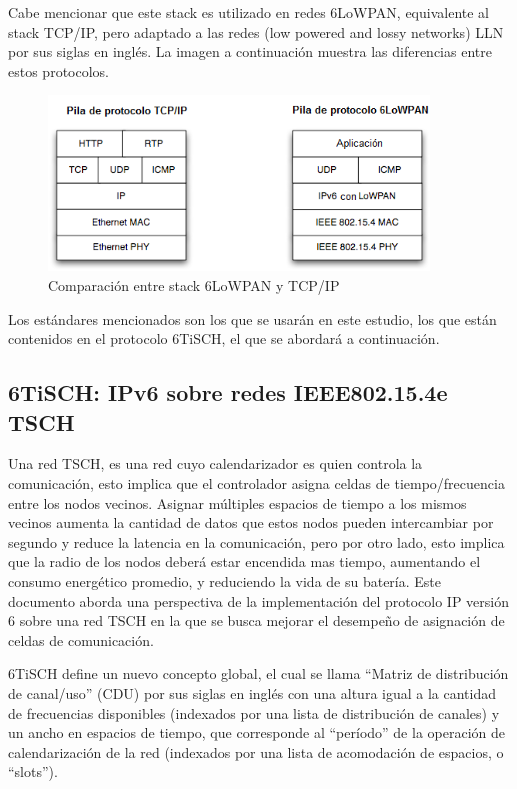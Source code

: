 Cabe mencionar que este stack es utilizado en redes 6LoWPAN, equivalente al stack TCP/IP, pero adaptado a las redes (low powered and lossy networks) LLN por sus siglas en inglés. La imagen a continuación muestra las diferencias entre estos protocolos.

\begin{figure}[h]
\centering
\graphicspath{ {imagenes/} }
\includegraphics[width=0.9\textwidth]{stack.png}
\caption{Comparación entre stack 6LoWPAN y TCP/IP}
\label{stack}
\end{figure}

Los estándares mencionados son los que se usarán en este estudio, los que están contenidos en el protocolo 6TiSCH, el que se abordará a continuación.




\subsection{6TiSCH: IPv6 sobre redes IEEE802.15.4e TSCH}


Una red TSCH, es una red cuyo calendarizador es quien controla la comunicación, esto implica que el controlador asigna celdas de tiempo/frecuencia entre los nodos vecinos. Asignar múltiples espacios de tiempo a los mismos vecinos aumenta la cantidad de datos que estos nodos pueden intercambiar por segundo y reduce la latencia en la comunicación, pero por otro lado, esto implica que la radio de los nodos deberá estar encendida mas tiempo, aumentando el consumo energético promedio, y reduciendo la vida de su batería. Este documento aborda una perspectiva de la implementación del protocolo IP versión 6 sobre una red TSCH en la que se busca mejorar el desempeño de asignación de celdas de comunicación.

6TiSCH define un nuevo concepto global, el cual se llama ``Matriz de distribución de canal/uso'' (CDU) por sus siglas en inglés con una altura igual a la cantidad de frecuencias disponibles (indexados por una lista de distribución de canales) y un ancho en espacios de tiempo, que corresponde al ``período'' de la operación de calendarización de la red (indexados por una lista de acomodación de espacios, o ``slots'').

